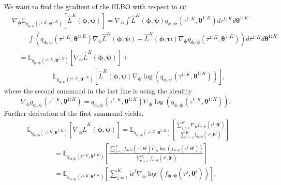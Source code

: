 \documentclass{article}
\newcommand{\bParam}{\bm{\theta}}
\newcommand{\E}{\mathbb{E}}
\begin{document}
We want to find the gradient of the ELBO with respect to $\bm{\phi}$:
\begin{align*}
    & \nabla_{\bm{\phi}} \E_{q_{\bm{\phi}, \bm{\psi}}(\tau^{1:K},\bParam^{1:K})}[\hat{L}^K(\bm{\phi}, \bm{\psi})] = \nabla_{\bm{\phi}} \int \hat{L}^K(\bm{\phi}, \bm{\psi}) q_{\bm{\phi}, \bm{\psi}}(\tau^{1:K}, \bParam^{1:K}) d\tau^{1:K} d\bParam^{1:K} \\
    & \quad = \int \left( q_{\bm{\phi}, \bm{\psi}}(\tau^{1:K}, \bParam^{1:K}) \nabla_{\bm{\phi}} \hat{L}^K(\bm{\phi}, \bm{\psi}) + \hat{L}^K(\bm{\phi}, \bm{\psi}) \nabla_{\bm{\phi}} q_{\bm{\phi}, \bm{\psi}}(\tau^{1:K}, \bParam^{1:K}) \right) d\tau^{1:K} d\bParam^{1:K} \\
    & \quad = \E_{q_{\bm{\phi}, \bm{\psi}}(\tau^{1:K}, \bParam^{1:K})}[\nabla_{\bm{\phi}} \hat{L}^K(\bm{\phi}, \bm{\psi})] + \\
    & \qquad \qquad \qquad \E_{q_{\bm{\phi}, \bm{\psi}}(\tau^{1:K}, \bParam^{1:K})}[\hat{L}^K(\bm{\phi}, \bm{\psi}) \nabla_{\bm{\phi}} \log(q_{\bm{\phi}, \bm{\psi}}(\tau^{1:K}, \bParam^{1:K}))],
\end{align*}
where the second summand in the last line is using the identity
\[ \nabla_{\bm{\phi}} q_{\bm{\phi}, \bm{\psi}}(\tau^{1:K}, \bParam^{1:K}) = q_{\bm{\phi}, \bm{\psi}}(\tau^{1:K}, \bParam^{1:K}) \nabla_{\bm{\phi}} \log(q_{\bm{\phi}, \bm{\psi}}(\tau^{1:K}, \bParam^{1:K})). \]
Further derivation of the first summand yields,
\begin{align}
    & \E_{q_{\bm{\phi}, \bm{\psi}}(\tau^{1:K}, \bParam^{1:K})}[\nabla_{\bm{\phi}} \hat{L}^K(\bm{\phi}, \bm{\psi})] = \E_{q_{\bm{\phi}, \bm{\psi}}(\tau^{1:K}, \bParam^{1:K})}\left[\frac{\sum\limits_{j=1}^{K} \nabla_{\bm{\phi}} f_{\bm{\phi}, \bm{\psi}}(\tau^j, \bParam^j)}{\sum\limits_{i=1}^{K} f_{\bm{\phi}, \bm{\psi}}(\tau^i, \bParam^i)}\right] \nonumber \\
    & \qquad \qquad = \E_{q_{\bm{\phi}, \bm{\psi}}(\tau^{1:K}, \bParam^{1:K})}\left[\frac{\sum\limits_{j=1}^{K} f_{\bm{\phi}, \bm{\psi}}(\tau^j, \bParam^j) \nabla_{\bm{\phi}} \log(f_{\bm{\phi}, \bm{\psi}}(\tau^j, \bParam^j))}{\sum\limits_{i=1}^{K} f_{\bm{\phi}, \bm{\psi}}(\tau^i, \bParam^i)}\right] \nonumber \\
    & \qquad \qquad = \E_{q_{\bm{\phi}, \bm{\psi}}(\tau^{1:K}, \bParam^{1:K})}\left[\sum\limits_{j=1}^{K} \tilde{w}^j \nabla_{\bm{\phi}} \log(f_{\bm{\phi}, \bm{\psi}}(\tau^j, \bParam^j))\right]. \label{eq:presummand1}
\end{align}
\end{document}

